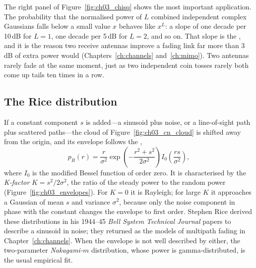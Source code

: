 The right panel of Figure~\ref{fig:ch03_chisq} shows the most important application. The
probability that the normalised power of $L$ combined independent complex Gaussians falls below a
small value $x$ behaves like $x^L$: a slope of one decade per 10\,dB for $L=1$, one decade per
5\,dB for $L=2$, and so on. That slope is the , and it is the reason two
receive antennas improve a fading link far more than 3\,dB of extra power would
(Chapters~\ref{ch:channels} and~\ref{ch:mimo}). Two antennas rarely fade at the same moment, just as
two independent coin tosses rarely both come up tails ten times in a row.


\subsection{The Rice distribution}

If a constant component $s$ is added---a sinusoid plus noise, or a line-of-sight path plus
scattered paths---the cloud of Figure~\ref{fig:ch03_cn_cloud} is shifted away from the origin, and
its envelope follows the ,
\begin{equation}
p_R(r)=\frac{r}{\sigma^2}\exp\!\left(-\frac{r^2+s^2}{2\sigma^2}\right)I_0\!\left(\frac{rs}{\sigma^2}\right),
\label{eq:ch03:rice}
\end{equation}
where $I_0$ is the modified Bessel function of order zero. It is characterised by the
\emph{K-factor} $K=s^2/2\sigma^2$, the ratio of the steady power to the random power
(Figure~\ref{fig:ch03_envelopes}). For $K=0$ it is Rayleigh; for large $K$ it approaches a Gaussian
of mean $s$ and variance $\sigma^2$, because only the noise component in phase with the constant
changes the envelope to first order. Stephen Rice derived these distributions in his 1944--45
\emph{Bell System Technical Journal} papers to describe a sinusoid in noise; they returned as the
models of multipath fading in Chapter~\ref{ch:channels}. When the envelope is not well described by
either, the two-parameter \emph{Nakagami-$m$} distribution, whose power is gamma-distributed, is the
usual empirical fit.


